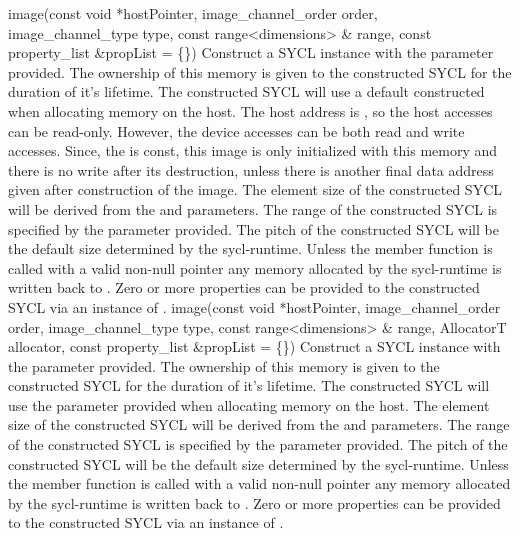     \addRowFiveSL
      {image(const void *hostPointer, }
      { image_channel_order order, }
      { image_channel_type type, }
      { const range<dimensions> \& range, }
      { const property_list \&propList = \{\}) }
      {
         Construct a SYCL  instance with the  parameter provided. The ownership of this memory is given to the constructed SYCL  for the duration of it's lifetime.
         The constructed SYCL  will use a default constructed  when allocating memory on the host.
         The host address is , so the host accesses can be read-only. However, the device accesses can be both read and write accesses. Since, the  is const, this image is only initialized with this memory and there is no write after its destruction, unless there is another final data address given after construction of the image.
         The element size of the constructed SYCL  will be derived from the  and  parameters.
         The range of the constructed SYCL  is specified by the  parameter provided.
         The pitch of the constructed SYCL  will be the default size determined by the \gls{sycl-runtime}.
         Unless the member function  is called with a valid non-null pointer any memory allocated by the \gls{sycl-runtime} is written back to .
         Zero or more properties can be provided to the constructed SYCL  via an instance of .
    }
    \addRowSixSL
      {image(const void *hostPointer, }
      { image_channel_order order, }
      { image_channel_type type, }
      { const range<dimensions> \& range, }
      { AllocatorT allocator, }
      { const property_list \&propList = \{\}) }
      {
         Construct a SYCL  instance with the  parameter provided. The ownership of this memory is given to the constructed SYCL  for the duration of it's lifetime.       
         The constructed SYCL  will use the  parameter provided when allocating memory on the host.
         The element size of the constructed SYCL  will be derived from the  and  parameters.
         The range of the constructed SYCL  is specified by the  parameter provided.
         The pitch of the constructed SYCL  will be the default size determined by the \gls{sycl-runtime}.
         Unless the member function  is called with a valid non-null pointer any memory allocated by the \gls{sycl-runtime} is written back to .
         Zero or more properties can be provided to the constructed SYCL  via an instance of .
      }
